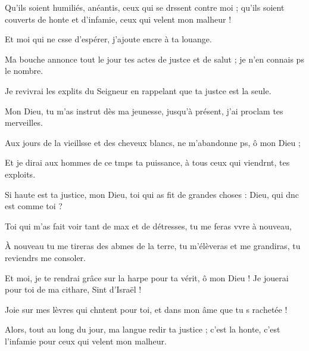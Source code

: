 \item Qu’ils soient humiliés, anéantis, ceux qui se drssent contre moi ;\psstar{} qu’ils soient couverts de honte et d’infamie, ceux qui velent mon malheur !
\item Et moi qui ne csse d’espérer,\psstar{} j’ajoute encre à ta louange.
\item Ma bouche annonce tout le jour\pscross{} tes actes de justce et de salut ;\psstar{} je n’en connais ps le nombre.
\item Je revivrai les explits du Seigneur\psstar{} en rappelant que ta justce est la seule.
\item Mon Dieu, tu m’as instrut dès ma jeunesse,\psstar{} jusqu’à présent, j’ai proclam tes merveilles.
\item Aux jours de la vieillsse et des cheveux blancs,\psstar{} ne m’abandonne ps, ô mon Dieu ; 
\item Et je dirai aux hommes de ce tmps ta puissance,\psstar{} à tous ceux qui viendrnt, tes exploits.
\item Si haute est ta justice, mon Dieu,\pscross{} toi qui as fit de grandes choses :\psstar{} Dieu, qui dnc est comme toi ?
\item Toi qui m’as fait voir tant de max et de détresses,\psstar{} tu me feras vvre à nouveau, 
\item À nouveau tu me tireras des abmes de la terre,\psstar{} tu m’élèveras et me grandiras, tu reviendrs me consoler.
\item Et moi, je te rendrai grâce sur la harpe pour ta vérit, ô mon Dieu !\psstar{} Je jouerai pour toi de ma cithare, Sint d’Israël !
\item Joie sur mes lèvres qui chntent pour toi,\psstar{} et dans mon âme que tu s rachetée !
\item Alors, tout au long du jour, ma langue redir ta justice ;\psstar{} c’est la honte, c’est l’infamie pour ceux qui velent mon malheur.